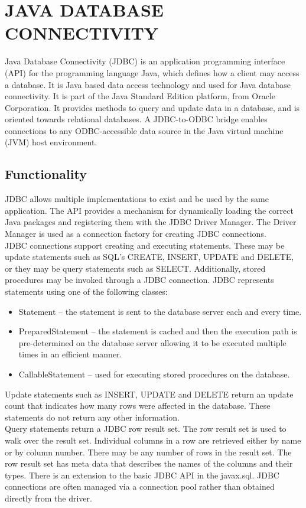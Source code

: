 \chapter{JAVA DATABASE CONNECTIVITY}
\thispagestyle{fancy}
Java Database Connectivity (JDBC) is an application programming interface (API) for the programming language Java, which defines how a client may access a database. It is Java based data access technology and used for Java database connectivity. It is part of the Java Standard Edition platform, from Oracle Corporation. It provides methods to query and
update data in a database, and is oriented towards relational databases. A JDBC-to-ODBC bridge enables connections to any ODBC-accessible data source in the Java virtual machine (JVM) host environment.

\section{Functionality}
JDBC allows multiple implementations to exist and be used by the same application. The API provides a mechanism for dynamically loading the correct Java packages and registering them with the JDBC Driver Manager. The Driver Manager is used as a connection factory for creating JDBC connections.\\
JDBC connections support creating and executing statements. These may be update statements such as SQL's CREATE, INSERT, UPDATE and DELETE, or they may be query statements such as SELECT. Additionally, stored procedures may be invoked through a JDBC connection. JDBC represents statements using one of the following classes:
\begin{itemize}
	\item Statement – the statement is sent to the database server each and every time.
	\item PreparedStatement – the statement is cached and then the execution path is pre-determined on the database server allowing it to be executed multiple times in an efficient manner.
	\item CallableStatement – used for executing stored procedures on the database.
\end{itemize}
Update statements such as INSERT, UPDATE and DELETE return an update count that indicates how many rows were affected in the database. These statements do not return any other information.\\
Query statements return a JDBC row result set. The row result set is used to walk over the result set. Individual columns in a row are retrieved either by name or by column number. There may be any number of rows in the result set. The row result set has meta data that describes the names of the columns and their types. There is an extension to the basic JDBC
API in the javax.sql. JDBC connections are often managed via a connection pool rather than obtained directly from the driver.

